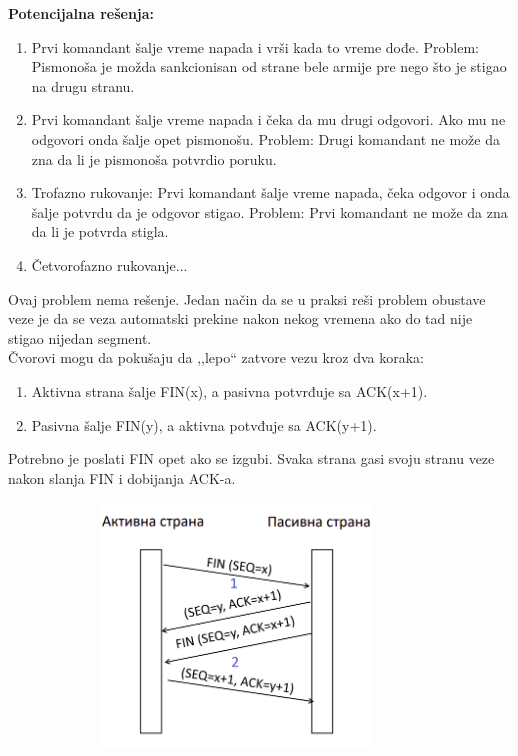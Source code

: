 \documentclass[a4paper]{article}
\begin{document}
        \noindent \textbf{Potencijalna rešenja:}
        \begin{enumerate}
            \item Prvi komandant šalje vreme napada i vrši kada to vreme dođe. Problem:
                  Pismonoša je možda sankcionisan od strane bele armije pre nego što je stigao
                  na drugu stranu.
            \item Prvi komandant šalje vreme napada i čeka da mu drugi odgovori. Ako mu ne
                  odgovori onda šalje opet pismonošu. Problem: Drugi komandant ne može
                  da zna da li je pismonoša potvrdio poruku.
            \item Trofazno rukovanje: Prvi komandant šalje vreme napada, čeka odgovor i onda
                  šalje potvrdu da je odgovor stigao. Problem: Prvi komandant ne može da zna
                  da li je potvrda stigla.
            \item Četvorofazno rukovanje...
        \end{enumerate}
        Ovaj problem nema rešenje. Jedan način da se u praksi reši problem obustave veze je 
        da se veza automatski prekine nakon nekog vremena ako do tad nije stigao nijedan segment.\\

        \noindent Čvorovi mogu da pokušaju da ,,lepo`` zatvore vezu kroz dva koraka:
        \begin{enumerate}
            \item Aktivna strana šalje FIN(x), a pasivna potvrđuje sa ACK(x+1).
            \item Pasivna šalje FIN(y), a aktivna potvđuje sa ACK(y+1).
        \end{enumerate}
        Potrebno je poslati FIN opet ako se izgubi. Svaka strana gasi svoju stranu veze nakon slanja
        FIN i dobijanja ACK-a.
        \begin{figure}[H]
            \begin{center}
                \includegraphics[width=100mm,height=65mm]{Slike/obustava_veze.png}
            \end{center}
        \end{figure}
\end{document}
